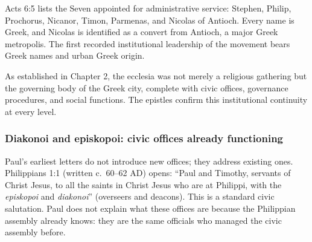 Acts 6:5 lists the Seven appointed for administrative service: Stephen, Philip, Prochorus, Nicanor, Timon, Parmenas, and Nicolas of Antioch.
Every name is Greek, and Nicolas is identified as a convert from Antioch, a major Greek metropolis.
The first recorded institutional leadership of the movement bears Greek names and urban Greek origin.

As established in Chapter 2, the ecclesia was not merely a religious gathering but the governing body of the Greek city, complete with civic offices, governance procedures, and social functions.
The epistles confirm this institutional continuity at every level.

\subsubsection{Diakonoi and episkopoi: civic offices already functioning}\label{subsubsec:diakonoi-and-episkopoi-civic-offices-already-functioning}

Paul's earliest letters do not introduce new offices; they address existing ones.
Philippians 1:1 (written c.~60--62 AD) opens: ``Paul and Timothy, servants of Christ Jesus, to all the saints in Christ Jesus who are at Philippi, with the \textit{episkopoi} and \textit{diakonoi}'' (overseers and deacons).
This is a standard civic salutation.
Paul does not explain what these offices are because the Philippian assembly already knows: they are the same officials who managed the civic assembly before.

